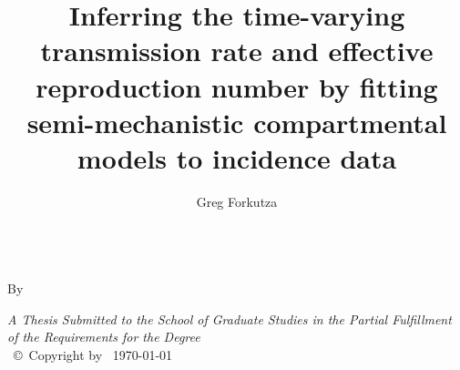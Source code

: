 \documentclass[
11pt, %
oneside, %
english, %
singlespacing, %
]{macthesis} %
\title{Inferring the time-varying transmission rate and effective reproduction number by fitting semi-mechanistic compartmental models to incidence data}
\author{Greg Forkutza}
\date{}
\def\blankpage{%
      \clearpage%
      \thispagestyle{empty}%
      \addtocounter{page}{-1}%
      \null%
      \clearpage}
\begin{document}
\sloppy

\frontmatter %

\pagestyle{plain} %

\vspace{6cm}
\begin{center}
\ttitle
\end{center}
\clearpage

\begin{center}

\vfill
\textsc{\Large \ttitle} \\

\vfill
{By \authorname\, \bdeg \, \mdeg }


 \vfill
{\large \textit{A Thesis Submitted to the School of Graduate Studies in the Partial Fulfillment of the Requirements for the Degree \degreename}}\\

\vfill
{\large \univname\, \copyright\, Copyright by \authorname\, \today}\\[4cm] %

\end{center}
\blankpage
\clearpage


\vspace*{0.2\textheight}

\bigbreak
\end{document}
